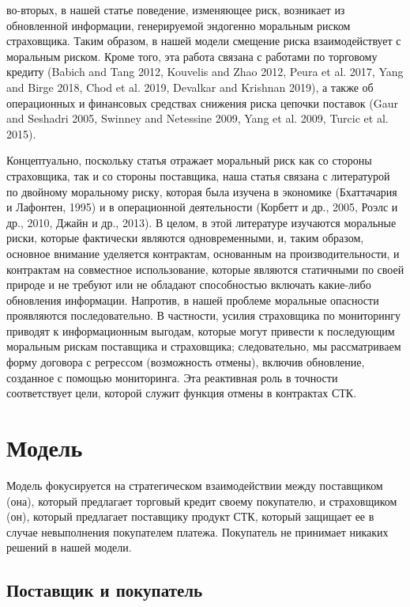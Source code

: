 \documentclass[a4paper,12pt]{article}
\begin{document}
во-вторых, в нашей статье поведение, изменяющее риск, возникает из обновленной информации, генерируемой эндогенно моральным риском страховщика. Таким образом, в нашей модели смещение риска взаимодействует с моральным риском. Кроме того, эта работа связана с работами по торговому кредиту (Babich and Tang 2012, Kouvelis and Zhao 2012, Peura et al. 2017, Yang and Birge 2018, Chod et al. 2019, Devalkar and Krishnan 2019), а также об операционных и финансовых средствах снижения риска цепочки поставок (Gaur and Seshadri 2005, Swinney and Netessine 2009, Yang et al. 2009, Turcic et al. 2015).


Концептуально, поскольку статья отражает моральный риск как со стороны страховщика, так и со стороны поставщика, наша статья связана с литературой по двойному моральному риску, которая была изучена в экономике (Бхаттачария и Лафонтен, 1995) и в операционной деятельности (Корбетт и др., 2005, Роэлс и др., 2010, Джайн и др., 2013). В целом, в этой литературе изучаются моральные риски, которые фактически являются одновременными, и, таким образом, основное внимание уделяется контрактам, основанным на производительности, и контрактам на совместное использование, которые являются статичными по своей природе и не требуют или не обладают способностью включать какие-либо обновления информации. Напротив, в нашей проблеме моральные опасности проявляются последовательно. В частности, усилия страховщика по мониторингу приводят к информационным выгодам, которые могут привести к последующим моральным рискам поставщика и страховщика; следовательно, мы рассматриваем форму договора с регрессом (возможность отмены), включив обновление, созданное с помощью мониторинга. Эта реактивная роль в точности соответствует цели, которой служит функция отмены в контрактах СТК.

\section{Модель}

Модель фокусируется на стратегическом взаимодействии между поставщиком (она), который предлагает торговый кредит своему покупателю, и страховщиком (он), который предлагает поставщику продукт СТК, который защищает ее в случае невыполнения покупателем платежа. Покупатель не принимает никаких решений в нашей модели.

\subsection{Поставщик и покупатель}
\end{document}
